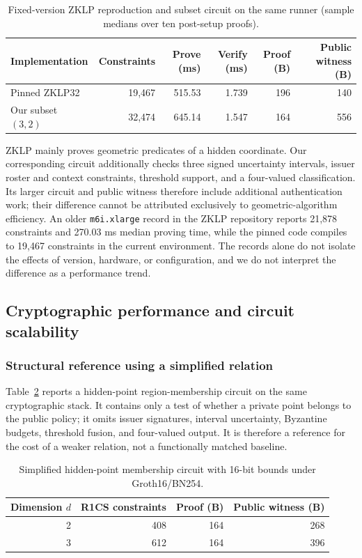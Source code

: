 \begin{table}[htbp]\centering\small
\caption{Fixed-version ZKLP reproduction and subset circuit on the same runner (sample medians over ten post-setup proofs).}\label{tab:zklp-repro}
\begin{tabular}{lrrrrr}\toprule
Implementation&Constraints&Prove (ms)&Verify (ms)&Proof (B)&Public witness (B)\\\midrule
Pinned ZKLP32&19,467&515.53&1.739&196&140\\
Our subset $(3,2)$&32,474&645.14&1.547&164&556\\\bottomrule
\end{tabular}
\end{table}

ZKLP mainly proves geometric predicates of a hidden coordinate. Our corresponding circuit additionally checks three signed uncertainty intervals, issuer roster and context constraints, threshold support, and a four-valued classification. Its larger circuit and public witness therefore include additional authentication work; their difference cannot be attributed exclusively to geometric-algorithm efficiency. An older \texttt{m6i.xlarge} record in the ZKLP repository reports 21,878 constraints and 270.03 ms median proving time, while the pinned code compiles to 19,467 constraints in the current environment. The records alone do not isolate the effects of version, hardware, or configuration, and we do not interpret the difference as a performance trend.

\subsection{Cryptographic performance and circuit scalability}
\subsubsection{Structural reference using a simplified relation}
Table~\ref{tab:point-zk} reports a hidden-point region-membership circuit on the same cryptographic stack. It contains only a test of whether a private point belongs to the public policy; it omits issuer signatures, interval uncertainty, Byzantine budgets, threshold fusion, and four-valued output. It is therefore a reference for the cost of a weaker relation, not a functionally matched baseline.

\begin{table}[htbp]\centering\small
\caption{Simplified hidden-point membership circuit with 16-bit bounds under Groth16/BN254.}\label{tab:point-zk}
\begin{tabular}{rrrr}\toprule
Dimension $d$&R1CS constraints&Proof (B)&Public witness (B)\\\midrule
2&408&164&268\\
3&612&164&396\\\bottomrule
\end{tabular}
\end{table}

